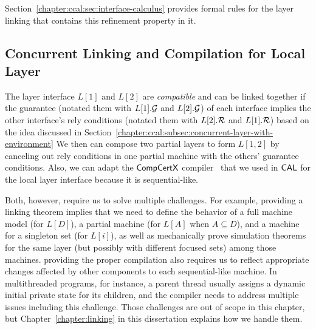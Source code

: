 {\noindent}Section~\ref{chapter:ccal:sec:interface-calculus} provides formal rules for the layer linking that contains this refinement property in it. 

\subsection{Concurrent Linking and Compilation for Local Layer}
\label{chapter:ccal:subsec:concurrent-linking-and compilation-for-local-layer}

The layer interface $L[1]$ and $L[2]$ are  {\em compatible} and can be linked together if the guarantee (notated them with $L[1].\mathcal{G}$ and $L[2].\mathcal{G}$) of
each interface implies the other interface's rely conditions (notated them with $L[2].\mathcal{R}$ and $L[1].\mathcal{R}$) based on
the idea discussed in Section~\ref{chapter:ccal:subsec:concurrent-layer-with-environment}
We then can compose two partial layers to form 
$L[1, 2]$ by canceling out rely conditions in one partial machine with the others' guarantee conditions.
Also, we can adapt the $\mathsf{CompCertX}$ compiler~\cite{deepspec} that we used in $\mathsf{CAL}$
for the local layer interface because it is sequential-like.

Both, however, require us to solve multiple challenges. 
For example, providing a linking theorem  
implies that we need to define the behavior of a full machine model (for $L[D]$), a partial machine (for $L[A]$ when $A \subseteq D$), and 
a machine for a singleton set (for $L[i]$), as well as mechanically prove simulation theorems for the same layer (but possibly with different focused sets) among those machines. 
providing the proper compilation also requires 
us to reflect appropriate changes affected by other components to each sequential-like machine.
In multithreaded programs, for instance, a parent thread usually assigns a dynamic initial private state for its children,
and the compiler needs to address multiple issues including this challenge. 
Those challenges are out of scope in this chapter, but Chapter~\ref{chapter:linking} in this dissertation explains how we handle them.
